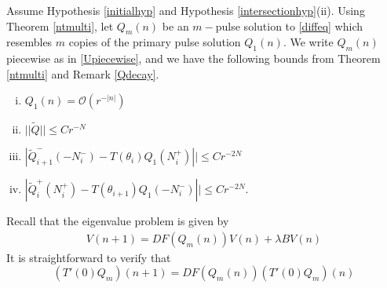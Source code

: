\documentclass[12pt]{article}
\begin{document}
Assume Hypothesis \ref{initialhyp} and Hypothesis \ref{intersectionhyp}(ii). Using Theorem \ref{ntmulti}, let $Q_m(n)$ be an $m-$pulse solution to \eqref{diffeq} which resembles $m$ copies of the primary pulse solution $Q_1(n)$. We write $Q_m(n)$ piecewise as in \eqref{Upiecewise}, and we have the following bounds from Theorem \ref{ntmulti} and Remark \ref{Qdecay}.
\begin{enumerate}[(i)]
\item $Q_1(n) = \mathcal{O}(r^{-|n|})$
\item $||\tilde{Q}|| \leq C r^{-N}$
\item $|\tilde{Q}_{i+1}^-(-N_i^-) - T(\theta_i) Q_1(N_i^+)|| \leq C r^{-2N}$ 
\item $|\tilde{Q}_i^+(N_i^+) - T(\theta_{i+1}) Q_1(-N_i^-)|| \leq C r^{-2N}$.
\end{enumerate}

Recall that the eigenvalue problem is given by 
\begin{align*}
V(n+1) = DF(Q_m(n)) V(n) + \lambda B V(n)
\end{align*}
It is straightforward to verify that 
\begin{equation}\label{DFkernel1}
(T'(0)Q_m)(n+1) = DF(Q_m(n))(T'(0)Q_m)(n)
\end{equation}
\end{document}
